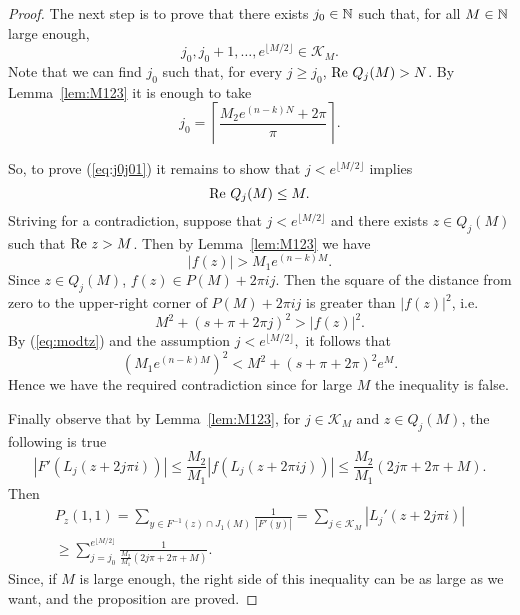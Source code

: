 \begin{proof}
  The next step is to prove that there exists $j_0\in{\mathbb N}$ such that, for
  all $M\in{\mathbb N}$ large enough,
  \begin{equation} \label{eq:j0j01} j_0,j_0+1,\ldots,e^{\lfloor M\slash
      2\rfloor} \in\mathcal{K}_M.
  \end{equation}
  Note that we can find $j_0$ such that, for every $j \geq j_0$, $\textrm{Re }
  Q_j(M)>N$. By Lemma~\ref{lem:M123} it is enough to take
  \[
  j_0=\left\lceil\frac{M_2 e^{(n-k)N}+2\pi}{\pi}\right\rceil.
  \]
  
  So, to prove (\ref{eq:j0j01}) it remains to show that $j<e^{\lfloor
    M\slash 2\rfloor}$ implies
  \[
  \textrm{Re } Q_j(M)\leq M.
  \]
  Striving for a contradiction, suppose that $j<e^{\lfloor M\slash
    2\rfloor}$ and there exists $z\in Q_j(M)$ such that $\textrm{Re } z > M$.  Then
  by Lemma~\ref{lem:M123} we have
  \begin{equation} \label{eq:modtz}
  |f( z)|>M_1 e^{(n-k) M}.
  \end{equation}
  Since $z\in Q_j(M)$, $f(z)\in P(M) + 2\pi i j$. Then the square of the
  distance from zero to the upper-right corner of $P(M) + 2\pi i j$ is
  greater than $|f(z)|^2$, i.e.
  \[
  M^2+(s+\pi+2\pi j)^2 > |f(z)|^2.
  \]
  By (\ref{eq:modtz}) and the assumption $j<e^{\lfloor M\slash 2\rfloor},$
  it follows that
  \[
  (M_1 e^{(n-k) M})^2<M^2+(s+\pi+2\pi)^2 e^M.
  \]
  Hence we have the required contradiction since for large $M$ the
  inequality is false.
  
  Finally observe that by Lemma~\ref{lem:M123}, for $j\in\mathcal{K}_M$ and
  $z\in Q_j(M)$, the following is true
  \[
  |F'(L_j(z+2j\pi i))|\leq \frac{M_2}{M_1}|f(L_j(z+2\pi i j))|\leq
  \frac{M_2}{M_1}(2 j\pi + 2\pi + M).
  \]
  Then
  \begin{multline*}
    P_z(1,1)=\sum_{y\in F^{-1}(z)\cap J_1(M)} \tfrac{1} {|F'(y)|}=
    \sum_{j\in\mathcal{K}_M}|L_j'(z+2j\pi i)|\\
    \geq \sum_{j=j_0}^{e^{\lfloor M\slash 2\rfloor}} \tfrac{1}{
      \frac{M_2}{M_1}(2 j\pi + 2\pi + M)}.
  \end{multline*}
  Since, if $M$ is large enough, the right side of this inequality can be
  as large as we want, and the proposition are proved.
\end{proof}

